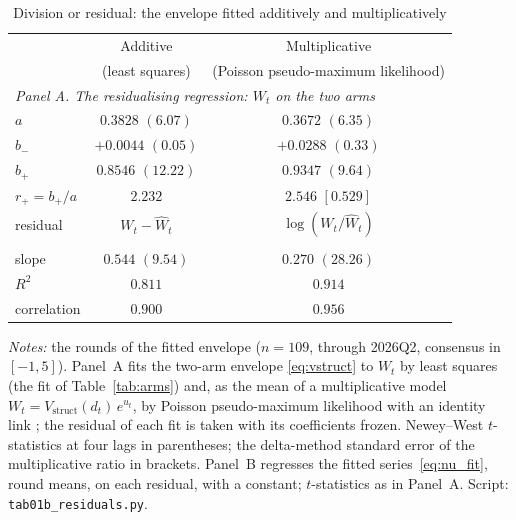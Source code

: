 \begin{table}[tbp]\centering
\caption{Division or residual: the envelope fitted additively and multiplicatively}\label{tab:residuals}
\begin{tabular}{lcc}
\toprule
 & Additive & Multiplicative \\
 & (least squares) & (Poisson pseudo-maximum likelihood) \\
\midrule
\multicolumn{3}{l}{\emph{Panel A. The residualising regression: $W_t$ on the two arms}}\\
$a$ & $0.3828$ $(6.07)$ & $0.3672$ $(6.35)$ \\
$b_-$ & $+0.0044$ $(0.05)$ & $+0.0288$ $(0.33)$ \\
$b_+$ & $0.8546$ $(12.22)$ & $0.9347$ $(9.64)$ \\
$r_+=b_+/a$ & $2.232$ & $2.546$ $[0.529]$ \\
residual & $W_t-\widehat W_t$ & $\log(W_t/\widehat W_t)$ \\
\addlinespace
\multicolumn{3}{l}{\emph{Panel B. $\mathrm{NU}^{\mathrm{fit}}_t$ regressed on the residual}}\\
slope & $0.544$ $(9.54)$ & $0.270$ $(28.26)$ \\
$R^2$ & $0.811$ & $0.914$ \\
correlation & $0.900$ & $0.956$ \\
\bottomrule
\end{tabular}
\vspace{0.3em}
\parbox{0.95\linewidth}{\footnotesize \textit{Notes:} the rounds of the fitted envelope
($n=109$, through 2026Q2, consensus in $[-1,5]$). Panel~A fits the two-arm envelope
\eqref{eq:vstruct} to $W_t$ by least squares (the fit of Table~\ref{tab:arms}) and, as the
mean of a multiplicative model $W_t=V_{\mathrm{struct}}(d_t)\,e^{u_t}$, by Poisson
pseudo-maximum likelihood with an identity link \citep{santos2006log}; the residual of each
fit is taken with its coefficients frozen. Newey--West $t$-statistics at four lags in
parentheses; the delta-method standard error of the multiplicative ratio in brackets.
Panel~B regresses the fitted series~\eqref{eq:nu_fit}, round means, on each residual, with a
constant; $t$-statistics as in Panel~A. Script: \texttt{tab01b\_residuals.py}.}
\end{table}
